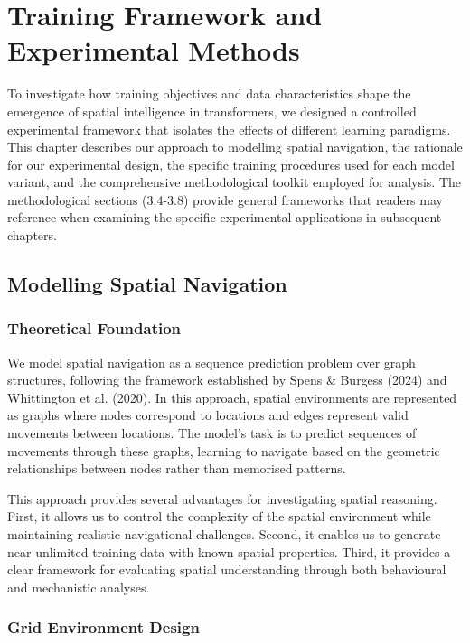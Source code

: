 
\chapter{Training Framework and Experimental Methods}

To investigate how training objectives and data characteristics shape the emergence of spatial intelligence in transformers, we designed a controlled experimental framework that isolates the effects of different learning paradigms. This chapter describes our approach to modelling spatial navigation, the rationale for our experimental design, the specific training procedures used for each model variant, and the comprehensive methodological toolkit employed for analysis. The methodological sections (3.4-3.8) provide general frameworks that readers may reference when examining the specific experimental applications in subsequent chapters.

\section{Modelling Spatial Navigation}

\subsection{Theoretical Foundation}

We model spatial navigation as a sequence prediction problem over graph structures, following the framework established by Spens \& Burgess (2024) and Whittington et al. (2020). In this approach, spatial environments are represented as graphs where nodes correspond to locations and edges represent valid movements between locations. The model's task is to predict sequences of movements through these graphs, learning to navigate based on the geometric relationships between nodes rather than memorised patterns.

This approach provides several advantages for investigating spatial reasoning. First, it allows us to control the complexity of the spatial environment while maintaining realistic navigational challenges. Second, it enables us to generate near-unlimited training data with known spatial properties. Third, it provides a clear framework for evaluating spatial understanding through both behavioural and mechanistic analyses.

\subsection{Grid Environment Design}

